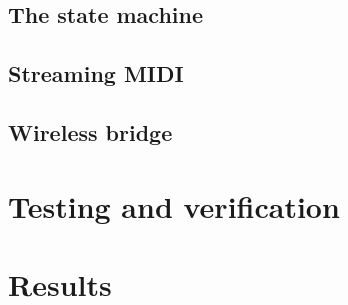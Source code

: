 \documentclass{article}
\begin{document}
\subsection{The state machine}

\subsection{Streaming MIDI}

\subsection{Wireless bridge}

\section{Testing and verification}

\section{Results}
\end{document}
